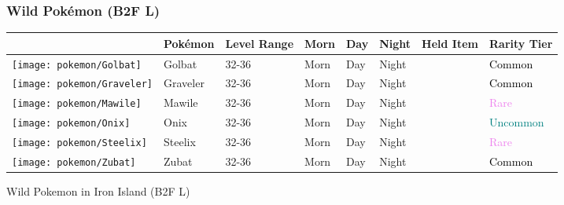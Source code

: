 \subsubsection{Wild Pokémon (B2F L)}%
\label{ssubsec:WildPokmon(B2FL)}%
\begin{longtable}{||l l l l l l l l||}%
\hline%
&Pokémon&Level Range&Morn&Day&Night&Held Item&Rarity Tier\\%
\hline%
\endhead%
\hline%
\texttt{[image: pokemon/Golbat]}&Golbat&32{-}36&Morn&Day&Night&&\textcolor{black}{%
Common%
}\\%
\hline%
\texttt{[image: pokemon/Graveler]}&Graveler&32{-}36&Morn&Day&Night&&\textcolor{black}{%
Common%
}\\%
\hline%
\texttt{[image: pokemon/Mawile]}&Mawile&32{-}36&Morn&Day&Night&&\textcolor{violet}{%
Rare%
}\\%
\hline%
\texttt{[image: pokemon/Onix]}&Onix&32{-}36&Morn&Day&Night&&\textcolor{teal}{%
Uncommon%
}\\%
\hline%
\texttt{[image: pokemon/Steelix]}&Steelix&32{-}36&Morn&Day&Night&&\textcolor{violet}{%
Rare%
}\\%
\hline%
\texttt{[image: pokemon/Zubat]}&Zubat&32{-}36&Morn&Day&Night&&\textcolor{black}{%
Common%
}\\%
\hline%
\end{longtable}%
\caption{Wild Pokemon in Iron Island (B2F L)}